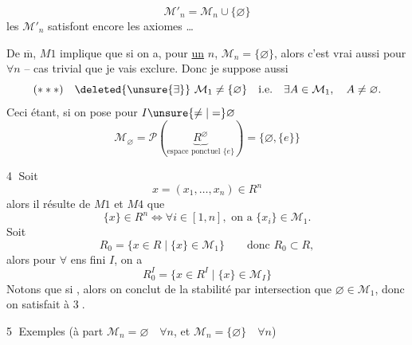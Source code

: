 \[
\mathcal M'_n=\mathcal M_n\cup\{\varnothing\}
\]
les $\mathcal M'_n$ satisfont encore les axiomes \ldots


De $\overline{\mathrm m}$,  $M1$ implique que si on a, pour \uline{un} $n$,  $\mathcal M_n=\{\varnothing\}$, alors c'est vrai aussi pour $\forall n$ -- cas trivial  que je vais exclure. Donc je suppose aussi
\[
(***)\quad\deleted{\unsure{\exists}}\ \mathcal M_1\ne\{\varnothing\}\quad\text{i.e.}\quad\exists A\in\mathcal M_1,\quad A\ne\varnothing.
\]
Ceci étant, si on pose pour $I\unsure{\ne|=}\varnothing$
\[
\mathcal M_\varnothing=\mathcal P(\underbrace{R^\varnothing}_{\text{espace ponctuel }\{e\}})=\{\varnothing,\{e\}\}
\]

\textcircled{4} Soit 
\[
x=(x_1,\ldots,x_n)\in R^n
\]
alors il résulte de $M1$ et $M4$ que
\[
\{x\}\in R^n\Longleftrightarrow\forall i\in[1,n],\text{ on a }\{x_i\}\in\mathcal M_1.
\]
Soit
\[
R_0=\{x\in R\mid\{x\}\in\mathcal M_1\}\qquad\text{donc }R_0\subset R,
\]
alors pour $\forall$ ens fini $I$, on a
\[
R_0^I=\{x\in R^I\mid\{x\}\in\mathcal M_I\}
\]
Notons que si  , alors on conclut de la stabilité  par intersection que $\varnothing\in\mathcal M_1$, donc on satisfait à \textcircled{3}.

\textcircled{5} Exemples (à part $\mathcal M_n=\varnothing\quad\forall n$, et $\mathcal M_n=\{\varnothing\}\quad\forall n$)
